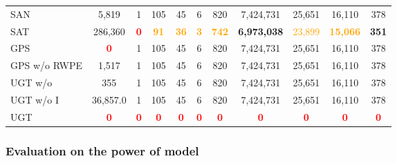 \documentclass[oneside]{article}
\begin{document}
\begin{table*}[t]
\begin{adjustbox}{width=1\textwidth}
\begin{tabular}{l  c  cc cccc ccc}
    SAN  & 5,819 & 1  & 105  &  45  &6   &  820 & 7,424,731  & 25,651  & 16,110  &378  \\

    SAT& 286,360 &  \textcolor{red}{\textbf{0}} & \textcolor{orange}{\textbf{ 91}} & \textcolor{orange}{\textbf{36}} & \textcolor{orange}{\textbf{3 }}&\textcolor{orange}{\textbf{742}} &  {\textbf{ 6,973,038}} & \textcolor{orange}{{23,899}} & \textcolor{orange}{\textbf{15,066 }} & {\textbf{351}} \\
    
    GPS&   \textcolor{red}{\textbf{0}} & 1  & 105  &  45  &6   &  820 & 7,424,731  & 25,651  & 16,110  &378 \\
    GPS w/o RWPE &  1,517 & 1  & 105  &  45  &6   &  820 & 7,424,731  & 25,651  & 16,110  &378 \\\hline
    
    UGT w/o  & 355 & 1  & 105  &  45  &6   &  820 & 7,424,731  & 25,651  & 16,110  &378  \\
    
    UGT w/o I & 36,857.0 & 1  & 105  &  45  &6   &  820 & 7,424,731  & 25,651  & 16,110  &378  \\
    
    UGT       & \textcolor{red}{\textbf{0}} & \textcolor{red}{\textbf{0}}  & \textcolor{red}{\textbf{0}}   &  \textcolor{red}{\textbf{0}}  &\textcolor{red}{\textbf{0}}   &  \textcolor{red}{\textbf{0}}& \textcolor{red}{\textbf{0}}  & \textcolor{red}{\textbf{0}}  & \textcolor{red}{\textbf{0}} &\textcolor{red}{\textbf{0}} \\\hline
\end{tabular}
\end{adjustbox}
  \label{tab:isomorphic_testing}
\end{table*}



































\subsubsection{Evaluation on the power of model}
\end{document}
